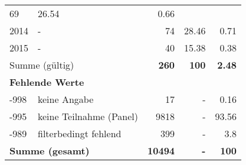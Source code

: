 \begin{longtable}{lXrrr}
       \num{69} &
       \num[round-mode=places,round-precision=2]{26.54} &
         \num[round-mode=places,round-precision=2]{0.66} \\

     2014 &
     \multicolumn{1}{X}{ -  } &


       \num{74} &
       \num[round-mode=places,round-precision=2]{28.46} &
         \num[round-mode=places,round-precision=2]{0.71} \\

     2015 &
     \multicolumn{1}{X}{ -  } &


       \num{40} &
       \num[round-mode=places,round-precision=2]{15.38} &
         \num[round-mode=places,round-precision=2]{0.38} \\
     \midrule
     \multicolumn{2}{l}{Summe (gültig)} &
       \textbf{\num{260}} &
     \textbf{\num{100}} &
       \textbf{\num[round-mode=places,round-precision=2]{2.48}} \\
     \multicolumn{5}{l}{\textbf{Fehlende Werte}}\\
       -998 &
       keine Angabe &
         \num{17} &
        - &
         \num[round-mode=places,round-precision=2]{0.16} \\
       -995 &
       keine Teilnahme (Panel) &
         \num{9818} &
        - &
         \num[round-mode=places,round-precision=2]{93.56} \\
       -989 &
       filterbedingt fehlend &
         \num{399} &
        - &
         \num[round-mode=places,round-precision=2]{3.8} \\
     \midrule
     \multicolumn{2}{l}{\textbf{Summe (gesamt)}} &
          \textbf{\num{10494}} &
        \textbf{-} &
        \textbf{\num{100}} \\
     \bottomrule
     \end{longtable}
     
